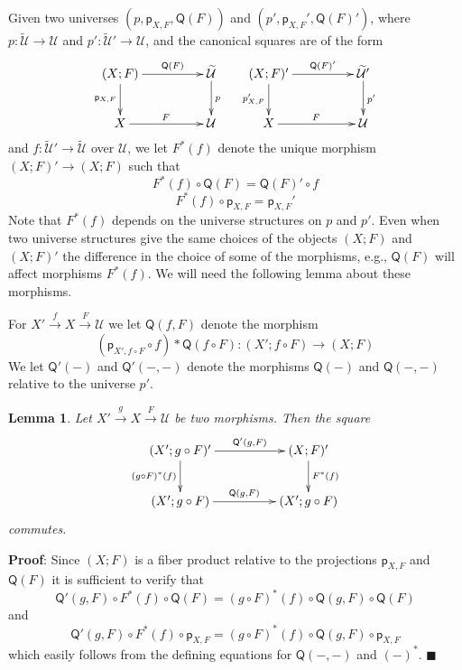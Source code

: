 \documentclass[12pt]{article}
\numberwithin{equation}{section}
\newenvironment{eq}{\begin{equation}}{\end{equation}}
\newenvironment{myproof}{{\bf Proof}:}{$\blacksquare$ \vskip 5mm }
\newtheorem{lemma}[proposition]{Lemma}
\newcommand{\llabel}[1]{\label{#1}}
\newcommand{\sr}{\rightarrow}
\newcommand{\wt}{\widetilde}
\newcommand{\spc}{{\,\,\,\,\,\,\,}}
\newcommand{\p}{\mathsf{p}}
\newcommand{\U}{\mathcal{U}}
\newcommand{\Q}{\mathsf{Q}}
\begin{document}
Given two universes $(p,\p_{X,F},\Q(F))$ and $(p',\p_{X,F}',\Q(F)')$, where
$p:\wt{\U}\sr \U$ and $p':\wt{\U}'\sr \U$, and the canonical squares are of the form
%
$$
\begin{xy}
          \xymatrix@C=4pc{ (X;F) \ar[r]^-{\Q(F)} \ar[d]_{\p_{X,F}} & \wt{\U}
            \ar[d]^{p}\\ X \ar[r]^{F} & \U }
\end{xy}
\spc
\begin{xy}
          \xymatrix@C=4pc{ (X;F)' \ar[r]^-{\Q(F)'} \ar[d]_{p'_{X,F}} & \wt{\U}'
            \ar[d]^{p'}\\ X \ar[r]^{F} & \U }
\end{xy}
$$
%
and $f:\wt{\U}'\sr \wt{\U}$ over $\U$, we let $F^*(f)$ denote the unique morphism
$(X;F)'\sr (X;F)$ such that
%
\begin{eq}\llabel{2015.04.08.eq3}
F^*(f)\circ \Q(F)=\Q(F)'\circ f
\end{eq}%
%
\begin{eq}\llabel{2015.04.08.eq4}
F^*(f)\circ \p_{X,F}=\p_{X,F}'
\end{eq}%
%
Note that $F^*(f)$ depends on the universe structures on $p$ and $p'$. Even
when two universe structures give the same choices of the objects $(X;F)$ and
$(X;F)'$ the difference in the choice of some of the morphisms, e.g., $\Q(F)$
will affect morphisms $F^*(f)$. We will need the following lemma about these
morphisms.

For $X'\stackrel{f}{\sr}X \stackrel{F}{\sr}\U$ we let $\Q(f,F)$ denote the
morphism
%
$$(\p_{X',f\circ F}\circ f)*\Q(f\circ F):(X';f\circ F)\sr (X;F)$$
%
We let $\Q'(-)$ and $\Q'(-,-)$ denote the morphisms $\Q(-)$ and $\Q(-,-)$ relative
to the universe $p'$.
%
\begin{lemma}
\llabel{2015.04.20.l1} Let $X'\stackrel{g}{\sr}X\stackrel{F}{\sr}\U$ be two
morphisms. Then the square
%
$$
\begin{xy}
          \xymatrix@C=4pc{ (X';g\circ F)' \ar[r]^-{\Q'(g,F)} \ar[d]_{(g\circ
              F)^*(f)} & (X;F)' \ar[d]^{F^*(f)}\\ (X';g\circ F) \ar[r]^{\Q(g,F)}
            & (X';g\circ F) }
\end{xy}
$$
%
commutes.
%
\end{lemma}
%
\begin{myproof}
Since $(X;F)$ is a fiber product relative to the projections $\p_{X,F}$ and
$\Q(F)$ it is sufficient to verify that
%
$$\Q'(g,F)\circ F^*(f)\circ \Q(F)=(g\circ F)^*(f) \circ \Q(g,F)\circ \Q(F)$$
%
and
%
$$\Q'(g,F)\circ F^*(f)\circ \p_{X,F}=(g\circ F)^*(f) \circ \Q(g,F)\circ \p_{X,F}$$
%
which easily follows from the defining equations for $\Q(-,-)$ and $(-)^*$.
\end{myproof}
\end{document}

